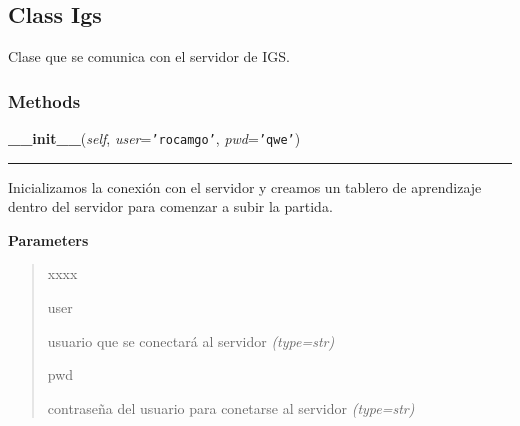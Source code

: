 
\subsection{Class Igs}

    \label{src:igs:Igs}

Clase que se comunica con el servidor de IGS.


  \subsubsection{Methods}

    \label{src:igs:Igs:__init__}

    \vspace{0.5ex}

\hspace{.8\funcindent}\begin{boxedminipage}{\funcwidth}

    \raggedright \textbf{\_\_init\_\_}(\textit{self}, \textit{user}={\tt \texttt{'}\texttt{rocamgo}\texttt{'}}, \textit{pwd}={\tt \texttt{'}\texttt{qwe}\texttt{'}})

    \vspace{-1.5ex}

    \rule{\textwidth}{0.5\fboxrule}
\setlength{\parskip}{2ex}
Inicializamos la conexión con el servidor y creamos un tablero de aprendizaje dentro del servidor para comenzar a subir la partida.

\setlength{\parskip}{1ex}
      \textbf{Parameters}
      \vspace{-1ex}

      \begin{quote}
        \begin{Ventry}{xxxx}

          \item[user]


usuario que se conectará al servidor
            {\it (type=str)}

          \item[pwd]


contraseña del usuario para conetarse al servidor
            {\it (type=str)}

        \end{Ventry}

      \end{quote}

    \end{boxedminipage}


